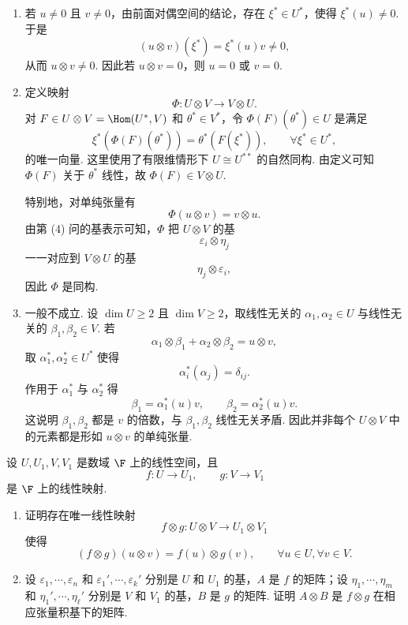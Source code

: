 \begin{solution}
\begin{enumerate}
		\item 若 $u\ne0$ 且 $v\ne0$，由前面对偶空间的结论，存在 $\xi^*\in U^*$，使得 $\xi^*(u)\ne0$. 于是
		\[
		(u\otimes v)(\xi^*)=\xi^*(u)v\ne0,
		\]
		从而 $u\otimes v\ne0$. 因此若 $u\otimes v=0$，则 $u=0$ 或 $v=0$.
		
		\item 定义映射
		\[
		\Phi:U\otimes V\longrightarrow V\otimes U.
		\]
		对 $F\in U\otimes V=\Hom(U^*,V)$ 和 $\theta^*\in V^*$，令 $\Phi(F)(\theta^*)\in U$ 是满足
		\[
		\xi^*(\Phi(F)(\theta^*))=\theta^*(F(\xi^*)),
		\qquad \forall \xi^*\in U^*,
		\]
		的唯一向量. 这里使用了有限维情形下 $U\cong U^{**}$ 的自然同构. 由定义可知 $\Phi(F)$ 关于 $\theta^*$ 线性，故 $\Phi(F)\in V\otimes U$.
		
		特别地，对单纯张量有
		\[
		\Phi(u\otimes v)=v\otimes u.
		\]
		由第 (4) 问的基表示可知，$\Phi$ 把 $U\otimes V$ 的基
		\[
		\varepsilon_i\otimes\eta_j
		\]
		一一对应到 $V\otimes U$ 的基
		\[
		\eta_j\otimes\varepsilon_i,
		\]
		因此 $\Phi$ 是同构.
		
		\item 一般不成立. 设 $\dim U\ge2$ 且 $\dim V\ge2$，取线性无关的 $\alpha_1,\alpha_2\in U$ 与线性无关的 $\beta_1,\beta_2\in V$. 若
		\[
		\alpha_1\otimes\beta_1+\alpha_2\otimes\beta_2=u\otimes v,
		\]
		取 $\alpha_1^*,\alpha_2^*\in U^*$ 使得
		\[
		\alpha_i^*(\alpha_j)=\delta_{ij}.
		\]
		作用于 $\alpha_1^*$ 与 $\alpha_2^*$ 得
		\[
		\beta_1=\alpha_1^*(u)v,
		\qquad
		\beta_2=\alpha_2^*(u)v.
		\]
		这说明 $\beta_1,\beta_2$ 都是 $v$ 的倍数，与 $\beta_1,\beta_2$ 线性无关矛盾. 因此并非每个 $U\otimes V$ 中的元素都是形如 $u\otimes v$ 的单纯张量.
	\end{enumerate}
\end{solution}

\begin{problem}
	设 $U,U_1,V,V_1$ 是数域 $\F$ 上的线性空间，且
	\[
	f:U\longrightarrow U_1,
	\qquad
	g:V\longrightarrow V_1
	\]
	是 $\F$ 上的线性映射.
	\begin{enumerate}
		\item 证明存在唯一线性映射
		\[
		f\otimes g:U\otimes V\longrightarrow U_1\otimes V_1
		\]
		使得
		\[
		(f\otimes g)(u\otimes v)=f(u)\otimes g(v),
		\qquad \forall u\in U,
		\forall v\in V.
		\]
		\item 设 $\varepsilon_1,\cdots,\varepsilon_n$ 和 $\varepsilon_1',\cdots,\varepsilon_k'$ 分别是 $U$ 和 $U_1$ 的基，$A$ 是 $f$ 的矩阵；设 $\eta_1,\cdots,\eta_m$ 和 $\eta_1',\cdots,\eta_\ell'$ 分别是 $V$ 和 $V_1$ 的基，$B$ 是 $g$ 的矩阵. 证明 $A\otimes B$ 是 $f\otimes g$ 在相应张量积基下的矩阵.
	\end{enumerate}
\end{problem}

